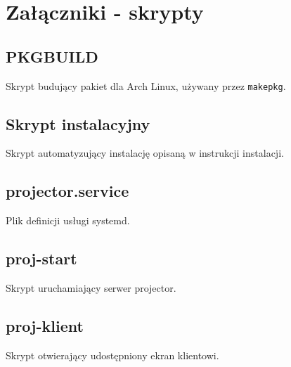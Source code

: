 \documentclass[a4paper,11pt]{article}
\begin{document}
    \section{Załączniki - skrypty}
        \subsection{PKGBUILD}
        Skrypt budujący pakiet dla Arch Linux, używany przez \texttt{makepkg}.
        \label{PKGBUILD}
        
        \subsection{Skrypt instalacyjny}
        \label{proj}
        Skrypt automatyzujący instalację opisaną w instrukcji instalacji.
        
        \subsection{projector.service}
        Plik definicji usługi systemd.
        \label{projector.service}
        
        \subsection{proj-start}
        Skrypt uruchamiający serwer projector.
        \label{proj-start}
        
        \subsection{proj-klient}
        Skrypt otwierający udostępniony ekran klientowi.
        \label{proj-klient}
        
\end{document}
